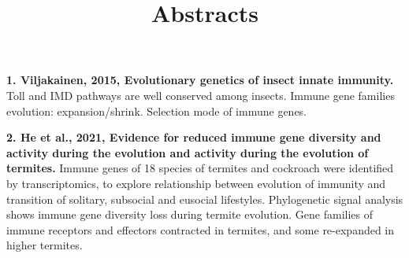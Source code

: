 \documentclass[11pt]{article}
\title{Abstracts}
\author{}
\date{}
\begin{document}
\begin{sloppypar}
  \maketitle

  \linenumbers

\textbf{1. Viljakainen, 2015, Evolutionary genetics of insect innate immunity.} \newline
Toll and IMD pathways are well conserved among insects. \newline
Immune gene families evolution: expansion/shrink. \newline
Selection mode of immune genes. \newline

\par

\textbf{2. He et al., 2021, Evidence for reduced immune gene diversity and activity during the evolution and activity during the evolution of termites.}
Immune genes of 18 species of termites and cockroach were identified by transcriptomics, to explore relationship between evolution of immunity and transition of solitary, subsocial and eusocial lifestyles. 
Phylogenetic signal analysis shows immune gene diversity loss during termite evolution. 
Gene families of immune receptors and effectors contracted in termites, and some re-expanded in higher termites.

\end{sloppypar}
\end{document}

